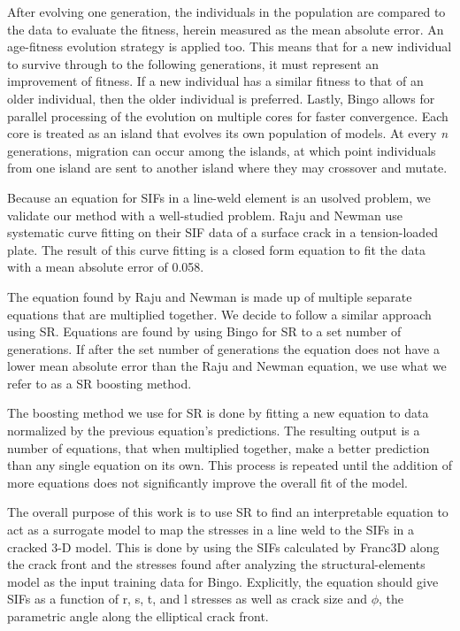 After evolving one generation, the individuals in the population are compared to
the data to evaluate the fitness, herein measured as the mean absolute error. An
age-fitness evolution strategy is applied too. This means that for a new
individual to survive through to the following generations, it must represent an
improvement of fitness. If a new individual has a similar fitness to that of an
older individual, then the older individual is preferred. Lastly, Bingo allows
for parallel processing of the evolution on multiple cores for faster
convergence. Each core is treated as an island that evolves its own population
of models. At every \textit{n} generations, migration can occur among the
islands, at which point individuals from one island are sent to another island
where they may crossover and mutate.

Because an equation for SIFs in a line-weld element is an usolved problem, we validate our method with a well-studied problem. Raju and Newman \cite{raju1979stress} use systematic curve fitting on their SIF data of a surface crack in a tension-loaded plate. The result of this curve fitting is a closed form equation to fit the data with a mean absolute error of 0.058.

The equation found by Raju and Newman is made up of multiple separate equations that are multiplied together. We decide to follow a similar approach using SR. Equations are found by using Bingo for SR to a set number of generations. If after the set number of generations the equation does not have a lower mean absolute error than the Raju and Newman equation, we use what we refer to as a SR boosting method. 

The boosting method we use for SR is done by fitting a new equation to data normalized by the previous equation's predictions. The resulting output is a number of equations, that when multiplied together, make a better prediction than any single equation on its own. This process is repeated until the addition of more equations does not significantly improve the overall fit of the model.

The overall purpose of this work is to use SR to find an interpretable equation
to act as a surrogate model to map the stresses in a line weld to the SIFs in a
cracked 3-D model. This is done by using the SIFs calculated by Franc3D along
the crack front and the stresses found after analyzing the
structural-elements model as the input training data for Bingo. Explicitly,
the equation should give SIFs as a function of r, s, t, and l stresses as well
as crack size and $\phi$, the parametric angle along the elliptical crack front. 

